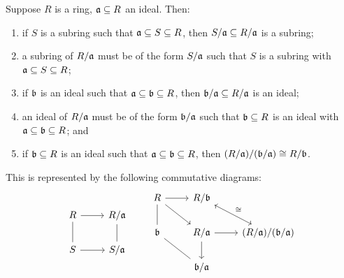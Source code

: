 \begin{theorem}\label{thm:iso-3-ring}
    Suppose \(R\) is a ring, \(\mathfrak{a} \subseteq R\) an ideal. Then:
    \begin{enumerate}[label={(\alph*)}, itemsep=0mm]
        \item if \(S\) is a subring such that \(\mathfrak{a} \subseteq S \subseteq R\),
            then \(S/\mathfrak{a} \subseteq R/\mathfrak{a}\) is a subring;
        \item a subring of \(R/\mathfrak{a}\) must be of the form \(S/\mathfrak{a}\)
            such that \(S\) is a subring with \(\mathfrak{a} \subseteq S \subseteq R\);
        \item if \(\mathfrak{b}\) is an ideal such that \(\mathfrak{a} \subseteq \mathfrak{b} \subseteq R\),
            then \(\mathfrak{b/a} \subseteq R/\mathfrak{a}\) is an ideal;
        \item an ideal of \(R/\mathfrak{a}\) must be of the form \(\mathfrak{b/a}\)
            such that \(\mathfrak{b} \subseteq R\) is an ideal
            with \(\mathfrak{a} \subseteq \mathfrak{b} \subseteq R\); and
        \item if \(\mathfrak{b} \subseteq R\) is an ideal such that \(\mathfrak{a} \subseteq \mathfrak{b} \subseteq R\),
            then \((R/\mathfrak{a})/(\mathfrak{b/a}) \cong R/\mathfrak{b}\).
    \end{enumerate}

    This is represented by the following commutative diagrams:
    \begin{equation*}
        \begin{tikzcd}
            R \arrow[dash]{d} \arrow{r} & R/\mfk{a} \arrow[dash]{d} \\
            S \arrow{r} & S/\mfk{a} %
        \end{tikzcd} \qquad
        \begin{tikzcd}
            R \arrow{r} \arrow[dash]{d} \arrow{rd} &
            R/\mfk{b} \arrow[leftrightarrow]{rd}{\cong} \\
            \mfk{b} \arrow[dash]{rd} & R/\mfk{a} \arrow{r} \arrow{d} & (R/\mfk{a})/(\mfk{b/a}) \\
            & \mfk{b/a}
        \end{tikzcd}
    \end{equation*}
\end{theorem}
